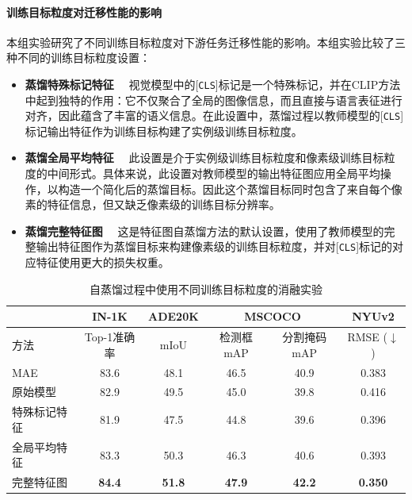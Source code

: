 \paragraph{训练目标粒度对迁移性能的影响} 本组实验研究了不同训练目标粒度对下游任务迁移性能的影响。本组实验比较了三种不同的训练目标粒度设置：
\begin{itemize}
    \item \textbf{蒸馏特殊标记特征}~~ 视觉模型中的[\texttt{CLS}]标记是一个特殊标记，并在CLIP方法中起到独特的作用：它不仅聚合了全局的图像信息，而且直接与语言表征进行对齐，因此蕴含了丰富的语义信息。在此设置中，蒸馏过程以教师模型的[\texttt{CLS}]标记输出特征作为训练目标构建了实例级训练目标粒度。
    \item \textbf{蒸馏全局平均特征}~~ 此设置是介于实例级训练目标粒度和像素级训练目标粒度的中间形式。具体来说，此设置对教师模型的输出特征图应用全局平均操作，以构造一个简化后的蒸馏目标。因此这个蒸馏目标同时包含了来自每个像素的特征信息，但又缺乏像素级的训练目标分辨率。
    \item \textbf{蒸馏完整特征图}~~ 这是特征图自蒸馏方法的默认设置，使用了教师模型的完整输出特征图作为蒸馏目标来构建像素级的训练目标粒度，并对[\texttt{CLS}]标记的对应特征使用更大的损失权重。
\end{itemize}

\begin{table}
\caption{自蒸馏过程中使用不同训练目标粒度的消融实验}
\centering
  \begin{tabular}{lccccc}
\toprule
   & IN-1K & ADE20K & \multicolumn{2}{c}{MSCOCO} & NYUv2 \\
   \midrule

   方法 &  Top-1准确率   &  mIoU  & 检测框mAP & 分割掩码mAP & RMSE\scriptsize{ ($\downarrow$)}\\
  \midrule

  MAE & 83.6 & 48.1 & 46.5 & 40.9 & 0.383 \\
    原始模型 & 82.9 & 49.5 & 45.0 & 39.8 & 0.416 \\ 
  \midrule
  特殊标记特征 & 81.9 & 47.5 & 44.8 & 39.6 & 0.396 \\
  全局平均特征  & 83.3 & 50.3 & 46.3 & 40.6 & 0.393 \\
  完整特征图 & \textbf{84.4} & \textbf{51.8} & \textbf{47.9} & \textbf{42.2} & \textbf{0.350} \\
\bottomrule
  \end{tabular}
\label{tab:fd-ablation_targets}
\end{table}

